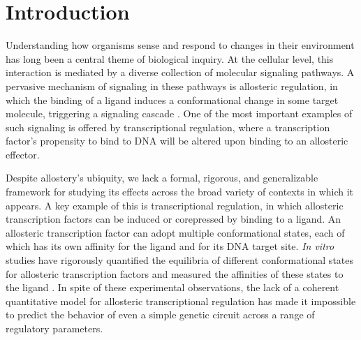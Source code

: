 
\section{Introduction}
Understanding how organisms sense and respond to changes in their environment
has long been a central theme of biological inquiry. At the cellular level,
this interaction is mediated by a diverse collection of molecular signaling
pathways. A pervasive mechanism of signaling in these pathways is allosteric
regulation, in which the binding of a ligand induces a conformational change
in some target molecule, triggering a signaling cascade \cite{Lindsley2006}.
One of the most important examples of such signaling is offered by
transcriptional regulation, where a transcription factor's propensity to bind
to DNA will be altered upon binding to an allosteric effector.

Despite allostery’s ubiquity, we lack a formal, rigorous, and generalizable
framework for studying its effects across the broad variety of contexts in
which it appears. A key example of this is transcriptional regulation, in
which allosteric transcription factors can be induced or corepressed by
binding to a ligand. An allosteric transcription factor can adopt multiple
conformational states, each of which has its own affinity for the ligand and
for its DNA target site. \textit{In vitro} studies have rigorously quantified
the equilibria of different conformational states for allosteric
transcription factors and measured the affinities of these states to the
ligand \cite{Harman2001,Lanfranco2017}. In spite of these experimental
observations, the lack of a coherent quantitative model for allosteric
transcriptional regulation has made it impossible to predict the behavior of
even a simple genetic circuit across a range of regulatory parameters.

